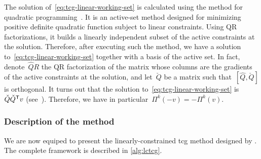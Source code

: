 The solution of~\cref{eq:tcg-linear-working-set} is calculated using the \citeauthor{Goldfarb_Idnani_1983} method for quadratic programming~\cite{Goldfarb_Idnani_1983}.
It is an active-set method designed for minimizing positive definite quadratic function subject to linear constraints.
Using QR factorizations, it builds a linearly independent subset of the active constraints at the solution.
Therefore, after executing such the \citeauthor{Goldfarb_Idnani_1983} method, we have a solution to~\cref{eq:tcg-linear-working-set} together with a basis of the active set.
In fact, denote~$\hat{Q}R$ the QR factorization of the matrix whose columns are the gradients of the active constraints at the solution, and let~$\check{Q}$ be a matrix such that~$[\hat{Q}, \check{Q}]$ is orthogonal.
It turns out that the solution to~\cref{eq:tcg-linear-working-set} is~$\check{Q} \check{Q}^{\mathsf{T}} v$ (see~\cite[Eq.~(3.7)]{Powell_2015}).
Therefore, we have in particular~$\Pi^k(-v) = -\Pi^k(v)$.

\subsubsection{Description of the  method}

We are now equiped to present the linearly-constrained \gls{tcg} method designed by \citeauthor{Powell_2015}.
The complete framework is described in \cref{alg:lctcg}.

